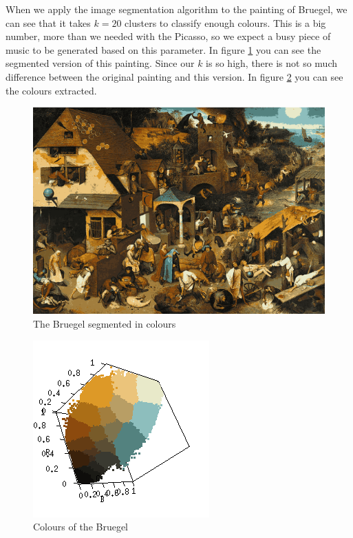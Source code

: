 \documentclass[12pt]{article}
\begin{document}
When we apply the image segmentation algorithm to the painting of Bruegel, we can see that it takes $k = 20$ clusters to classify enough colours. This is a big number, more than we needed with the Picasso, so we expect a busy piece of music to be generated based on this parameter. In figure \ref{bruegel_segmented} you can see the segmented version of this painting. Since our $k$ is so high, there is not so much difference between the original painting and this version. In figure \ref{bruegel_colors} you can see the colours extracted.  

\begin{figure}[h]
\hspace*{-0.70cm}
\centering
\includegraphics[scale = 0.5]{img/bruegel_segmented}
\caption{The Bruegel segmented in colours}
\label{bruegel_segmented}
\end{figure} 

\begin{figure}[h]
\centering
\includegraphics[scale = 0.8]{img/bruegel_colors}
\caption{Colours of the Bruegel}
\label{bruegel_colors}
\end{figure}
\end{document}

